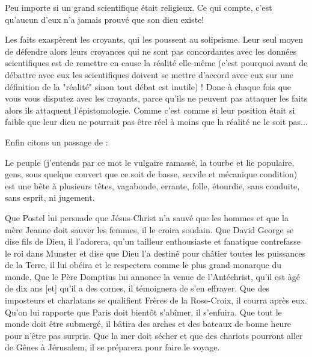 	\begin{fquote} Peu importe si un grand scientifique était religieux. Ce qui compte, c'est qu'aucun d'eux n'a jamais prouvé que son dieu existe! \end{fquote}
	
	Les faits exaspèrent les croyants, qui les poussent au solipsisme. Leur seul moyen de défendre alors leurs croyances qui ne sont pas concordantes avec les données scientifiques est de remettre en cause la réalité elle-même (c'est pourquoi avant de débattre avec eux les scientifiques doivent se mettre d'accord avec eux sur une définition de la "réalité" sinon tout débat est inutile) ! Donc à chaque fois que vous vous disputez avec les croyants, parce qu'ils ne peuvent pas attaquer les faits alors ils attaquent l'épistomologie. Comme c'est comme si leur position était si faible que leur dieu ne pourrait pas être réel à moins que la réalité ne le soit pas...
	
	Enfin citons un passage de \cite{2014traité}:
	
	\og Le peuple (j'entends par ce mot le vulgaire ramassé, la tourbe et lie populaire, gens, sous quelque couvert que ce soit de basse, servile et mécanique condition) est une bête à plusieurs têtes, vagabonde, errante, folle, étourdie, sans conduite, sans esprit, ni jugement. 
	
	Que Postel lui persuade que Jésus-Christ n'a sauvé que les hommes et que la mère Jeanne doit sauver les femmes, il le croira soudain. Que David George se dise fils de Dieu, il l'adorera, qu'un tailleur enthousiaste et fanatique contrefasse le roi dans Munster et dise que Dieu l'a destiné pour châtier toutes les puissances de la Terre, il lui obéira et le respectera comme le plus grand monarque du monde. Que le Père Domptius lui annonce la venue de l'Antéchrist, qu'il est àgé de dix ans [et] qu'il a des cornes, il témoignera de s'en effrayer. Que des imposteurs et charlatans se qualifient Frères de la Rose-Croix, il courra après eux. Qu'on lui rapporte que Paris doit bientôt s'abîmer, il s'enfuira. Que tout le monde doit être submergé, il bâtira des arches et des bateaux de bonne heure pour n'être pas surpris. Que la mer doit sécher et que des chariots pourront aller de Gênes à Jérusalem, il se préparera pour faire le voyage.
	
